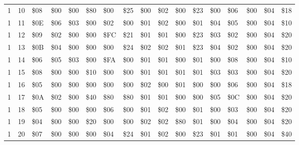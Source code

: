 \begin{tabular}{rrlllllllllllllll}
        1 &      10 & \$08       & \$00       & \$00       & \$80       & \$00       & \$25       & \$00       & \$02       & \$00       & \$23       & \$00       & \$06       & \$00       & \$04       & \$18       \\
        1 &      11 & \$0E       & \$06       & \$03       & \$00       & \$02       & \$00       & \$01       & \$02       & \$00       & \$01       & \$04       & \$05       & \$00       & \$04       & \$10       \\
        1 &      12 & \$09       & \$02       & \$00       & \$00       & \$FC       & \$21       & \$01       & \$01       & \$00       & \$23       & \$03       & \$02       & \$00       & \$04       & \$20       \\
        1 &      13 & \$0B       & \$04       & \$00       & \$00       & \$00       & \$24       & \$02       & \$02       & \$01       & \$23       & \$04       & \$02       & \$00       & \$04       & \$20       \\
        1 &      14 & \$06       & \$05       & \$03       & \$00       & \$FA       & \$00       & \$01       & \$01       & \$00       & \$01       & \$00       & \$08       & \$00       & \$04       & \$10       \\
        1 &      15 & \$08       & \$00       & \$00       & \$10       & \$00       & \$00       & \$01       & \$01       & \$01       & \$01       & \$03       & \$03       & \$00       & \$04       & \$20       \\
        1 &      16 & \$05       & \$00       & \$00       & \$00       & \$00       & \$00       & \$02       & \$00       & \$01       & \$00       & \$00       & \$06       & \$00       & \$04       & \$18       \\
        1 &      17 & \$0A       & \$02       & \$00       & \$40       & \$80       & \$80       & \$01       & \$01       & \$00       & \$00       & \$05       & \$0C       & \$00       & \$04       & \$20       \\
        1 &      18 & \$05       & \$00       & \$00       & \$00       & \$06       & \$00       & \$01       & \$02       & \$00       & \$01       & \$00       & \$03       & \$00       & \$04       & \$20       \\
        1 &      19 & \$04       & \$00       & \$00       & \$20       & \$00       & \$00       & \$02       & \$02       & \$80       & \$01       & \$00       & \$04       & \$00       & \$04       & \$20       \\
        1 &      20 & \$07       & \$00       & \$00       & \$00       & \$04       & \$24       & \$01       & \$02       & \$00       & \$23       & \$01       & \$01       & \$00       & \$04       & \$40       \\
\hline
\end{tabular}

